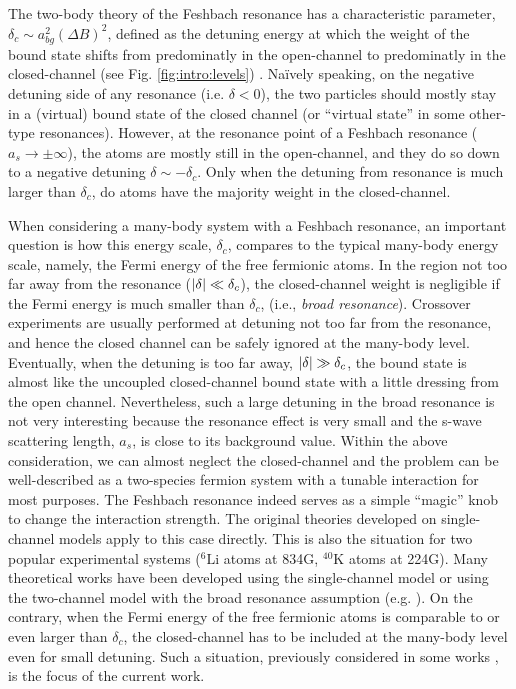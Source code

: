 \documentclass[reprint,pra]{revtex4-1}
\begin{document}
  The two-body theory of the Feshbach resonance has a characteristic  parameter, $\delta_c\sim{}a_{bg}^2(\Delta{B})^2$, defined as  the detuning energy at which the weight of the bound state shifts from predominatly in the open-channel to predominatly in the closed-channel (see Fig. \ref{fig:intro:levels}) \cite{Leggett}.  Na\"{i}vely speaking, on the negative detuning side of any resonance (i.e. $\delta<0$), the two particles should mostly stay  in a (virtual) bound state of the closed channel (or ``virtual state'' in some other-type resonances).  However, at the resonance point  of a Feshbach resonance ($a_s\to\pm\infty$), the atoms are mostly still in the open-channel, and they do so down to a negative detuning $\delta\sim-\delta_c$. Only when the detuning from resonance is much larger than $\delta_c$, do atoms have the majority weight in the closed-channel.    
  
  When considering a many-body system with a Feshbach resonance, an important question is how this energy scale, $\delta_c$, compares to the typical many-body energy scale, namely, the Fermi energy of the free fermionic atoms. In the region not too far away from the resonance ($\left\lvert{\delta}\right\rvert\ll\delta_{c}$), the closed-channel weight is negligible if the Fermi energy is much smaller than $\delta_c$, (i.e., \emph{broad resonance}).  Crossover experiments are usually performed at detuning not too far from the resonance, and hence the closed channel can be safely ignored at the many-body level. Eventually, when the detuning is too far away, $\left\lvert{\delta}\right\rvert\gg\delta_{c}$, the bound state is almost like the    uncoupled closed-channel bound state with a little dressing from the open channel.  
  Nevertheless, such a large detuning in the broad resonance is not very interesting because the  resonance effect is very small and the s-wave scattering length, $a_s$, is close to its background  value.  
  Within the above consideration, we can almost neglect the closed-channel  and the problem can be well-described as a two-species fermion system with a tunable interaction for most purposes.  The Feshbach resonance indeed serves as a simple ``magic'' knob to change the interaction strength.  The original  theories developed on  single-channel models  apply to this case directly.  This is also the situation for two  popular experimental systems (${}^{6}\text{Li}$ atoms at 834G, $^{40}\text{K}$ atoms at 224G).   Many theoretical works have been developed using the single-channel model or using the two-channel model with the broad resonance assumption (e.g. \cite{Holland01,HoUniversal,Fuchs04}). On the contrary, when the Fermi energy of the free fermionic atoms is  comparable to or even larger than $\delta_c$, the closed-channel has to be included at the many-body level even for small detuning. Such a situation, previously considered in some works \cite{GurarieNarrow}, is the focus of the current work.
  
\end{document}
